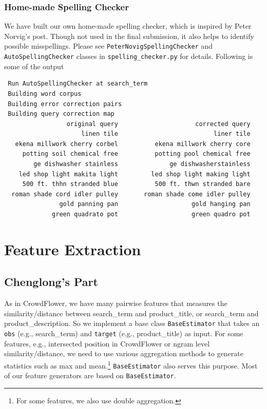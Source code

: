 \documentclass[12pt]{article}
\begin{document}
{{\subsubsection{Home-made Spelling Checker}
We have built our own home-made spelling checker, which is inspired by Peter Norvig's post\cite{PeterNorvig}. Though not used in the final submission, it also helps to identify possible misspellings. Please see \texttt{PeterNovigSpellingChecker} and \texttt{AutoSpellingChecker} classes in \texttt{spelling\_checker.py} for details. Following is some of the output
\begin{verbatim}
 Run AutoSpellingChecker at search_term
 Building word corpus
 Building error correction pairs
 Building query correction map
                 original query 	                corrected query
                     linen tile 	                     liner tile
   ekena millwork cherry corbel 	     ekena millwork cherry core
     potting soil chemical free 	     potting pool chemical free
        ge dishwasher stainless 	         ge dishwasherstainless
    led shop light makita light 	    led shop light making light
     500 ft. thhn stranded blue 	     500 ft. thwn stranded bare
  roman shade cord idler pulley 	  roman shade come idler pulley
               gold panning pan 	               gold hanging pan
             green quadrato pot 	               green quadro pot
\end{verbatim}

\section{Feature Extraction}
\subsection{Chenglong's Part}
\label{subsec:FeatureExtraction_Chenglong}
As in CrowdFlower, we have many pairwise features that measures the similarity/distance between search\_term and product\_title, or search\_term and product\_description. So we implement a base class \texttt{BaseEstimator} that takes an \texttt{obs} (e.g., search\_term) and \texttt{target} (e.g., product\_title) as input. For some features, e.g., intersected position in CrowdFlower or ngram level similarity/distance, we need to use various aggregation methods to generate statistics such as max and mean.\footnote{For some features, we also use double aggregation.} \texttt{BaseEstimator} also serves this purpose. Most of our feature generators are based on \texttt{BaseEstimator}.

}}
\end{document}

